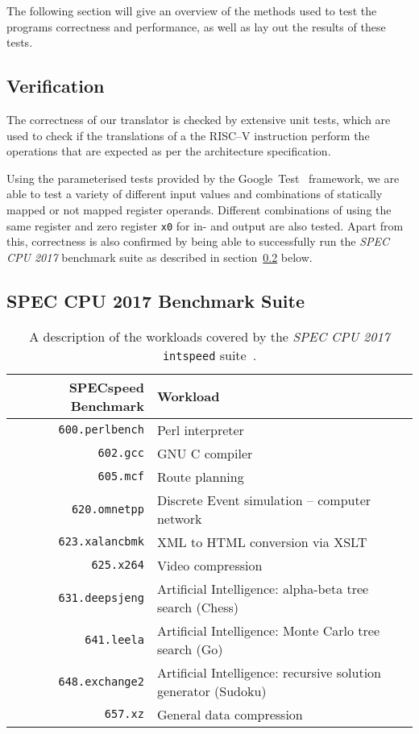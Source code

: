 The following section will give an overview of the methods used to test the programs correctness and performance, as well as lay out the results of these tests.
\subsection{Verification}
The correctness of our translator is checked by extensive unit tests, which are used to check if the translations of a the RISC--V instruction perform the operations that are expected as per the architecture specification.

Using the parameterised tests provided by the Google~Test~\cite{gtest} framework, we are able to test a variety of different input values and combinations of statically mapped or not mapped register operands.
Different combinations of using the same register and zero register \texttt{x0} for in- and output are also tested.
Apart from this, correctness is also confirmed by being able to successfully run the \textit{SPEC CPU 2017} benchmark suite as described in section~\ref{subsec:spec-cpu-2017-benchmark-suite} below.


\subsection{SPEC CPU 2017 Benchmark Suite}
\label{subsec:spec-cpu-2017-benchmark-suite}


\begin{table}
	\centering
	\begin{tabular}{rl}
		\toprule
		\textbf{SPECspeed Benchmark} & \textbf{Workload}\\
		\midrule
		\texttt{600.perlbench} & Perl interpreter\\
		\texttt{602.gcc} & GNU C compiler\\
		\texttt{605.mcf} & Route planning\\
		\texttt{620.omnetpp} & Discrete Event simulation -- computer network\\
		\texttt{623.xalancbmk} & XML to HTML conversion via XSLT\\
		\texttt{625.x264} & Video compression\\
		\texttt{631.deepsjeng} & Artificial Intelligence: alpha-beta tree search (Chess)\\
		\texttt{641.leela} & Artificial Intelligence: Monte Carlo tree search (Go)\\
		\texttt{648.exchange2} & Artificial Intelligence: recursive solution generator (Sudoku)\\
		\texttt{657.xz} & General data compression\\
		\bottomrule
	\end{tabular}
	\caption[SPEC CPU 2017 workload description]%
	{A description of the workloads covered by the \textit{SPEC CPU 2017} \texttt{intspeed} suite~\cite{spec-cpu-doc}.}
	\label{tab:spec-description}
\end{table}


